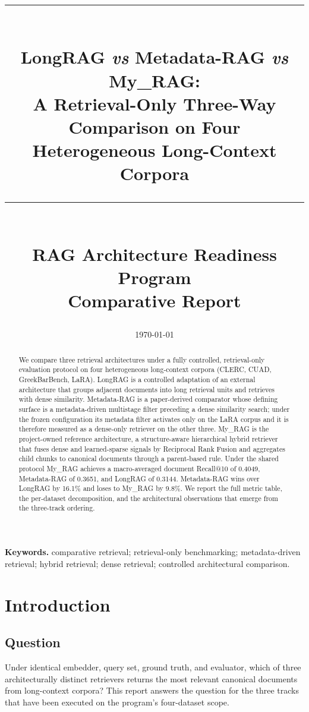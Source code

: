\documentclass[11pt,a4paper]{article}
\title{
  \vspace{-1.5cm}
  \rule{\linewidth}{0.4pt}\\[0.3cm]
  {\Large\bfseries LongRAG \emph{vs} Metadata-RAG \emph{vs}
   My\_RAG:}\\[0.15cm]
  {\large A Retrieval-Only Three-Way Comparison on Four\\
   Heterogeneous Long-Context Corpora}\\[0.2cm]
  \rule{\linewidth}{0.4pt}\\[0.4cm]
  \normalsize RAG Architecture Readiness Program\\
  \small Comparative Report
}
\author{}
\date{\today}
\begin{document}
\maketitle
\thispagestyle{empty}

\begin{abstract}
\noindent
We compare three retrieval architectures under a fully controlled,
retrieval-only evaluation protocol on four heterogeneous
long-context corpora (CLERC, CUAD, GreekBarBench, LaRA). LongRAG is
a controlled adaptation of an external architecture that groups
adjacent documents into long retrieval units and retrieves with
dense similarity. Metadata-RAG is a paper-derived comparator whose
defining surface is a metadata-driven multistage filter preceding a
dense similarity search; under the frozen configuration its metadata
filter activates only on the LaRA corpus and it is therefore
measured as a dense-only retriever on the other three. My\_RAG is
the project-owned reference architecture, a structure-aware
hierarchical hybrid retriever that fuses dense and learned-sparse
signals by Reciprocal Rank Fusion and aggregates child chunks to
canonical documents through a parent-based rule. Under the shared
protocol My\_RAG achieves a macro-averaged document Recall@10 of
\num{0.4049}, Metadata-RAG of \num{0.3651}, and LongRAG of
\num{0.3144}. Metadata-RAG wins over LongRAG by \num{16.1}\% and
loses to My\_RAG by \num{9.8}\%. We report the full metric table,
the per-dataset decomposition, and the architectural observations
that emerge from the three-track ordering.
\end{abstract}

\vfill
\noindent\textbf{Keywords.} comparative retrieval; retrieval-only
benchmarking; metadata-driven retrieval; hybrid retrieval; dense
retrieval; controlled architectural comparison.

\newpage
\tableofcontents
\newpage

\section{Introduction}

\subsection{Question}
Under identical embedder, query set, ground truth, and evaluator,
which of three architecturally distinct retrievers returns the most
relevant canonical documents from long-context corpora? This report
answers the question for the three tracks that have been executed on
the program's four-dataset scope.
\end{document}
